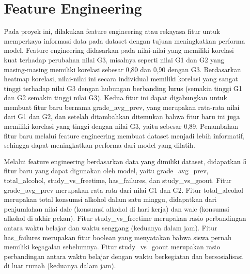 \section{Feature Engineering}
Pada proyek ini, dilakukan feature engineering atau rekayasa fitur untuk memperkaya informasi data pada dataset dengan tujuan meningkatkan performa model. Feature engineering didasarkan pada nilai-nilai yang memiliki korelasi kuat terhadap perubahan nilai G3, misalnya seperti nilai G1 dan G2 yang masing-masing memiliki korelasi sebesar 0,80 dan 0,90 dengan G3. Berdasarkan heatmap korelasi, nilai-nilai ini secara individual memiliki korelasi yang sangat tinggi terhadap nilai G3 dengan hubungan berbanding lurus (semakin tinggi G1 dan G2 semakin tinggi nilai G3). Kedua fitur ini dapat digabungkan untuk membuat fitur baru bernama grade\_avg\_prev, yang merupakan rata-rata nilai dari G1 dan G2, dan setelah ditambahkan ditemukan bahwa fitur baru ini juga memiliki korelasi yang tinggi dengan nilai G3, yaitu sebesar 0,89. Penambahan fitur baru melalui feature engineering membuat dataset menjadi lebih informatif, sehingga dapat meningkatkan performa dari model yang dilatih.

Melalui feature engineering berdasarkan data yang dimiliki dataset, didapatkan 5 fitur baru yang dapat digunakan oleh model, yaitu grade\_avg\_prev, total\_alcohol, study\_vs\_freetime, has\_failures, dan study\_vs\_goout. Fitur grade\_avg\_prev merupakan rata-rata dari nilai G1 dan G2. Fitur total\_alcohol merupakan total konsumsi alkohol dalam satu minggu, didapatkan dari penjumlahan nilai dalc (konsumsi alkohol di hari kerja) dan walc (konsumsi alkohol di akhir pekan). Fitur study\_vs\_freetime merupakan rasio perbandingan antara waktu belajar dan waktu senggang (keduanya dalam jam). Fitur has\_failures merupakan fitur boolean yang menyatakan bahwa siswa pernah memiliki kegagalan sebelumnya. Fitur study\_vs\_goout merupakan rasio perbandingan antara waktu belajar dengan waktu berkegiatan dan bersosialisasi di luar rumah (keduanya dalam jam).


